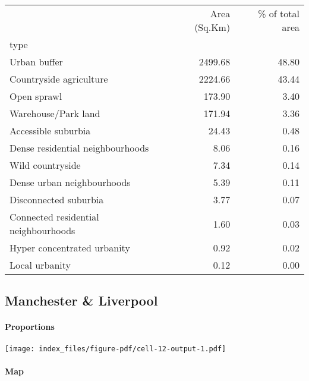 \documentclass[
  letterpaper,
  DIV=11,
  numbers=noendperiod,
  oneside]{scrartcl}
\let\oldparagraph\paragraph
\renewcommand{\paragraph}[1]{\oldparagraph{#1}\mbox{}}
\begin{document}
\begin{tabular}{lrr}
\toprule
{} &  Area (Sq.Km) &  \% of total area \\
type                                 &               &                  \\
\midrule
Urban buffer                         &       2499.68 &            48.80 \\
Countryside agriculture              &       2224.66 &            43.44 \\
Open sprawl                          &        173.90 &             3.40 \\
Warehouse/Park land                  &        171.94 &             3.36 \\
Accessible suburbia                  &         24.43 &             0.48 \\
Dense residential neighbourhoods     &          8.06 &             0.16 \\
Wild countryside                     &          7.34 &             0.14 \\
Dense urban neighbourhoods           &          5.39 &             0.11 \\
Disconnected suburbia                &          3.77 &             0.07 \\
Connected residential neighbourhoods &          1.60 &             0.03 \\
Hyper concentrated urbanity          &          0.92 &             0.02 \\
Local urbanity                       &          0.12 &             0.00 \\
\bottomrule
\end{tabular}

\hypertarget{manchester-liverpool}{%
\subsection{Manchester \& Liverpool}\label{manchester-liverpool}}

\hypertarget{proportions-1}{%
\paragraph{Proportions}\label{proportions-1}}

\texttt{[image: index\_files/figure-pdf/cell-12-output-1.pdf]}

\hypertarget{map-1}{%
\paragraph{Map}\label{map-1}}
\end{document}

